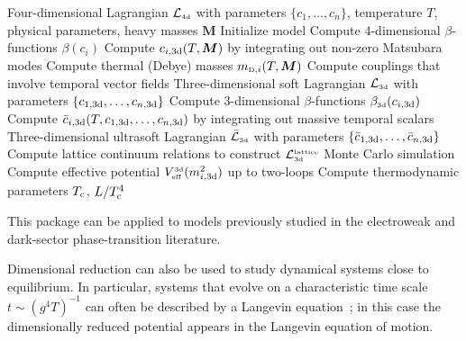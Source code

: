 \documentclass[11pt]{article}
\def\dralgo{{\tt DRalgo}}
\newcommand{\Tc}{T_{\rm c}}
\renewcommand{\rmi}[1]{{\mbox{\scriptsize #1}}}
\newcommand{\rmii}[1]{{\mbox{\tiny\rm{#1}}}}
\begin{document}
\begin{algorithm}
\caption{
\label{alg:dralgo}
  \dralgo{}
  algorithm outline
  in alignment with fig.~2 of~\cite{Schicho:2021gca}.
  The use of lattice resources is indicated as an optional path.
  The functions
  {\tt PerformDRhard[]},
  {\tt PerformDRsoft[]} and
  {\tt CalculatePotentialUS[]}
  are part of \dralgo{}.
}
\begin{algorithmic}
  Four-dimensional Lagrangian $\mathcal{L}_{\rmii{4d}}$ with 
  parameters $\{c_{1},\dots,c_{n}\}$,
  temperature $T$,
  physical parameters,
  heavy masses $\bm{M}$
  Initialize model 
    \State
      Compute 4-dimensional $\beta$-functions $\beta(c_{i})$
    \State
      Compute $c_{i,\rmi{3d}}(T,\bm{M})$ by integrating out non-zero Matsubara modes
  \EndFor
  \State 
    Compute thermal (Debye) masses $m_{\rmii{D},i}(T,\bm{M})$
  \State 
    Compute couplings that involve temporal vector fields
\EndCall
{}
Three-dimensional soft Lagrangian
$\mathcal{L}_{\rmii{3d}}$ with 
parameters $\{c_{1,\rmi{3d}},\dots,c_{n,\rmi{3d}}\}$
  \For{{\bf all}  $c_{i,\rmi{3d}} \in \{c_{1,\rmi{3d}},\dots,c_{n,\rmi{3d}}\}$}
    \State
      Compute 3-dimensional $\beta$-functions $\beta_{\rmii{3d}}(c_{i,\rmi{3d}})$
    \State
      Compute $\bar{c}_{i,\rmi{3d}}(T,c_{1,\rmi{3d}},\dots,c_{n,\rmi{3d}})$
      by integrating out
      massive temporal scalars
  \EndFor
\EndCall
{}
Three-dimensional ultrasoft Lagrangian
$\bar{\mathcal{L}}_{\rmii{3d}}$ with 
  parameters $\{\bar{c}_{1,\rmi{3d}},\dots,\bar{c}_{n,\rmi{3d}}\}$
  \State
    Compute lattice continuum relations to construct
    $\mathcal{L}^{\rmii{lattice}}_{\rmii{3d}}$
  \State
    Monte Carlo simulation
\Else
    \State
      Compute effective potential
      $V^{\rmii{3d}}_{\rmii{eff}}(m_{i,\rmi{3d}}^2)$
      up to two-loops 
  \EndCall
\EndIf
\State
  Compute thermodynamic parameters
  $\Tc$, $L/\Tc^4$ 
\end{algorithmic}
\end{algorithm}
This package can be applied to models previously studied in the
electroweak and dark-sector phase-transition literature.

Dimensional reduction can also be used to study dynamical systems close to equilibrium. In particular, systems that evolve on a characteristic time scale $t\sim (g^4 T)^{-1}$ can often be described by a Langevin equation~\cite{Bodeker:1999ey,Moore:2001vf,Moore:2000jw}; in this case the dimensionally reduced potential appears in the Langevin equation of motion.
\end{document}
